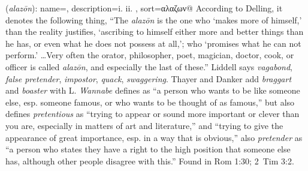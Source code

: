\item[Wannabe,]

(\textit{alazōn}):
{
    name=,
    description={i.  ii. },
    sort=αλαζων@
}
According to Delling, it denotes the following thing, ``The \emph{alazōn} is the one who `makes more of himself,' than the reality justifies, `ascribing to himself either more and better things than he has, or even what he does not possess at all,'; who `promises what he can not perform.' \ldots Very often the orator, philosopher, poet, magician, doctor, cook, or officer is called \emph{alazōn}, and especially the last of these.''
Liddell says \emph{vagabond}, \emph{false pretender}, \emph{impostor}, \emph{quack}, \emph{swaggering}. Thayer and Danker add \emph{braggart} and \emph{boaster} with L. \emph{Wannabe} defines as ``a person who wants to be like someone else, esp. someone famous, or who wants to be thought of as famous,'' but also defines \emph{pretentious} as ``trying to appear or sound more important or clever than you are, especially in matters of art and literature,'' and ``trying to give the appearance of great importance, esp. in a way that is obvious,'' also \emph{pretender} as ``a person who states they have a right to the high position that someone else has, although other people disagree with this.''
Found in Rom 1:30; 2~Tim 3:2.
